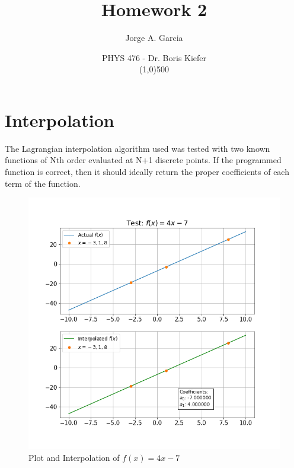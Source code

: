 \documentclass[twocolumn]{article}
\title{Homework 2}
\author{Jorge A. Garcia}
\date{PHYS 476 - Dr. Boris Kiefer\\\line(1,0){500}}
\begin{document}
\maketitle

\section{Interpolation}

The Lagrangian interpolation algorithm used was tested with two known functions of Nth order evaluated at
N+1 discrete points. If the programmed function is correct, then it should ideally return the proper
coefficients of each term of the function.
\begin{figure}[h!]
 \centering
 \includegraphics[scale = 0.4]{interp_test1}
 \caption{Plot and Interpolation of $f(x)=4x-7$}
 \label{fig:interp_test1}
\end{figure}
\end{document}
